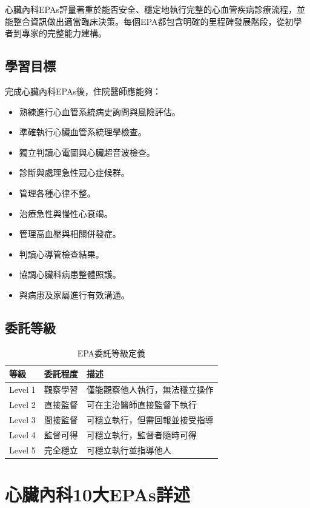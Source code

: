 \documentclass[12pt,a4paper]{article}
\newcommand{\note}[1]{
    \par
    \noindent
    \begin{tcolorbox}[
        colback=emergency_blue!5!white,
        colframe=emergency_blue,
        title=\textbf{重點提醒},
        fonttitle=\bfseries,
        boxrule=0.5pt,
        arc=3pt,
        left=6pt,
        right=6pt,
        top=6pt,
        bottom=6pt
    ]
    #1
    \end{tcolorbox}
}
\begin{document}
\vspace{0.5cm}
\note{
心臟內科EPAs評量著重於能否安全、穩定地執行完整的心血管疾病診療流程，並能整合資訊做出適當臨床決策。每個EPA都包含明確的里程碑發展階段，從初學者到專家的完整能力建構。
}

\subsection{學習目標}
完成心臟內科EPAs後，住院醫師應能夠：
\begin{itemize}[nosep]
    \item 熟練進行心血管系統病史詢問與風險評估。
    \item 準確執行心臟血管系統理學檢查。
    \item 獨立判讀心電圖與心臟超音波檢查。
    \item 診斷與處理急性冠心症候群。
    \item 管理各種心律不整。
    \item 治療急性與慢性心衰竭。
    \item 管理高血壓與相關併發症。
    \item 判讀心導管檢查結果。
    \item 協調心臟科病患整體照護。
    \item 與病患及家屬進行有效溝通。
\end{itemize}

\subsection{委託等級}
\begin{table}[h]
    \centering
    \caption{EPA委託等級定義}
    \begin{tabular}{p{2cm} p{3cm} p{9cm}}
        \toprule
        \textbf{等級} & \textbf{委託程度} & \textbf{描述} \\
        \midrule
        Level 1 & 觀察學習 & 僅能觀察他人執行，無法穩立操作 \\
        Level 2 & 直接監督 & 可在主治醫師直接監督下執行 \\
        Level 3 & 間接監督 & 可穩立執行，但需回報並接受指導 \\
        Level 4 & 監督可得 & 可穩立執行，監督者隨時可得 \\
        Level 5 & 完全穩立 & 可穩立執行並指導他人 \\
        \bottomrule
    \end{tabular}
\end{table}

\newpage
\section{心臟內科10大EPAs詳述}
\end{document}
